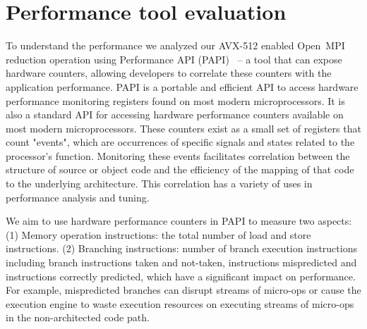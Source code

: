 \documentclass[sigconf]{acmart}
\newcommand{\ompi}[0]{Open~MPI\xspace}
\begin{document}
\section{Performance tool evaluation}\label{sec:perf}
To understand the performance we analyzed our AVX-512 enabled \ompi reduction
operation using Performance API (PAPI)~\cite{papi} -- a tool that can expose
hardware counters, allowing developers to correlate these counters
with the application performance.
PAPI is a portable and efficient API to access hardware performance
monitoring registers found on most modern microprocessors.
It is also a standard API for accessing hardware
performance counters available on most modern microprocessors. These counters exist
as a small set of registers that count "events", which are occurrences of specific signals
and states related to the processor's function. Monitoring these events facilitates
correlation between the structure of source or object code and the efficiency of the mapping
of that code to the underlying architecture. This correlation has a variety of uses in
performance analysis and tuning.


We aim to use hardware performance counters in PAPI to measure two aspects:
(1) Memory operation instructions: the total number of load and store instructions.
(2) Branching instructions: number of branch execution instructions including branch instructions taken and not-taken,
instructions mispredicted and instructions correctly predicted, which have a significant impact on performance.
For example, mispredicted branches can disrupt streams of micro-ops or cause
the execution engine to waste execution resources on executing
streams of micro-ops in the non-architected code path.
\end{document}
